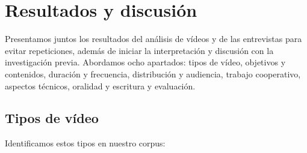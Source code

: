\documentclass[spanish]{textolivre}
\begin{document}
\section{Resultados y discusión}\label{sec-formato}
Presentamos juntos los resultados del análisis de vídeos y de las entrevistas para evitar repeticiones, además de iniciar la interpretación y discusión con la investigación previa. Abordamos ocho apartados: tipos de vídeo, objetivos y contenidos, duración y frecuencia, distribución y audiencia, trabajo cooperativo, aspectos técnicos, oralidad y escritura y evaluación.

\subsection{Tipos de vídeo}\label{sec-modelo}
Identificamos estos tipos en nuestro corpus:
\end{document}
